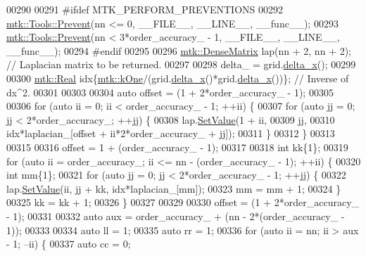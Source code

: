 \begin{DoxyCode}
00290 
00291 \textcolor{preprocessor}{  #ifdef MTK\_PERFORM\_PREVENTIONS}
00292   \hyperlink{classmtk_1_1Tools_a332324c6f25e66be9dff48c5987a3b9f}{mtk::Tools::Prevent}(nn <= 0, \_\_FILE\_\_, \_\_LINE\_\_, \_\_func\_\_);
00293   \hyperlink{classmtk_1_1Tools_a332324c6f25e66be9dff48c5987a3b9f}{mtk::Tools::Prevent}(nn < 3*order\_accuracy\_ - 1, \_\_FILE\_\_, \_\_LINE\_\_, \_\_func\_\_);
00294 \textcolor{preprocessor}{  #endif}
00295 
00296   \hyperlink{classmtk_1_1DenseMatrix}{mtk::DenseMatrix} lap(nn + 2, nn + 2); \textcolor{comment}{// Laplacian matrix to be returned.}
00297 
00298   delta\_ = grid.\hyperlink{classmtk_1_1UniStgGrid1D_a6e7173b01241632cf509496d66b9f74c}{delta\_x}();
00299 
00300   \hyperlink{group__c01-roots_gac080bbbf5cbb5502c9f00405f894857d}{mtk::Real} idx\{\hyperlink{group__c01-roots_ga26407c24d43b6b95480943340d285c71}{mtk::kOne}/(grid.\hyperlink{classmtk_1_1UniStgGrid1D_a6e7173b01241632cf509496d66b9f74c}{delta\_x}()*grid.\hyperlink{classmtk_1_1UniStgGrid1D_a6e7173b01241632cf509496d66b9f74c}{delta\_x}())\}; \textcolor{comment}{// Inverse of
       dx^2.}
00301 
00303 
00304   \textcolor{keyword}{auto} offset = (1 + 2*order\_accuracy\_ - 1);
00305 
00306   \textcolor{keywordflow}{for} (\textcolor{keyword}{auto} ii = 0; ii < order\_accuracy\_ - 1; ++ii) \{
00307     \textcolor{keywordflow}{for} (\textcolor{keyword}{auto} jj = 0; jj < 2*order\_accuracy\_; ++jj) \{
00308       lap.\hyperlink{classmtk_1_1DenseMatrix_a784ce5784109ac86bfb9d8562b334b13}{SetValue}(1 + ii,
00309                    jj,
00310                    idx*laplacian\_[offset + ii*2*order\_accuracy\_ + jj]);
00311     \}
00312   \}
00313 
00315 
00316   offset = 1 + (order\_accuracy\_ - 1);
00317 
00318   \textcolor{keywordtype}{int} kk\{1\};
00319   \textcolor{keywordflow}{for} (\textcolor{keyword}{auto} ii = order\_accuracy\_; ii <= nn - (order\_accuracy\_ - 1); ++ii) \{
00320     \textcolor{keywordtype}{int} mm\{1\};
00321     \textcolor{keywordflow}{for} (\textcolor{keyword}{auto} jj = 0; jj < 2*order\_accuracy\_ - 1; ++jj) \{
00322       lap.\hyperlink{classmtk_1_1DenseMatrix_a784ce5784109ac86bfb9d8562b334b13}{SetValue}(ii, jj + kk, idx*laplacian\_[mm]);
00323       mm = mm + 1;
00324     \}
00325     kk = kk + 1;
00326   \}
00327 
00329 
00330   offset = (1 + 2*order\_accuracy\_ - 1);
00331 
00332   \textcolor{keyword}{auto} aux = order\_accuracy\_ + (nn - 2*(order\_accuracy\_ - 1));
00333 
00334   \textcolor{keyword}{auto} ll = 1;
00335   \textcolor{keyword}{auto} rr = 1;
00336   \textcolor{keywordflow}{for} (\textcolor{keyword}{auto} ii = nn; ii > aux - 1; --ii) \{
00337     \textcolor{keyword}{auto} cc = 0;

\end{DoxyCode}
